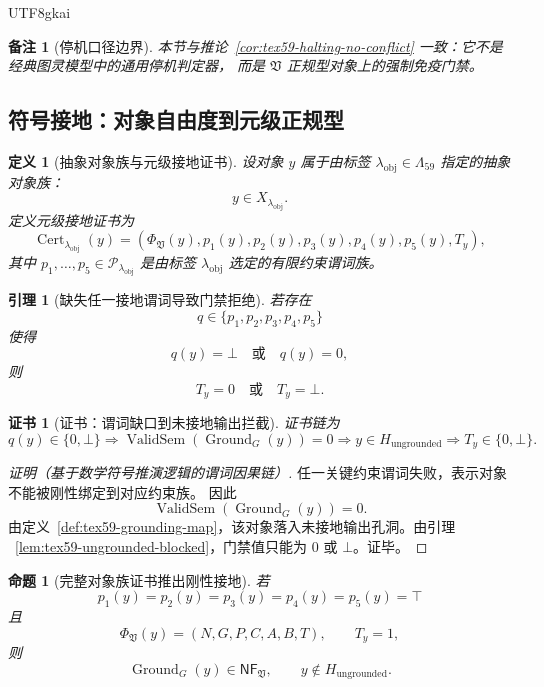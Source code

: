 \documentclass[12pt]{article}
\newtheorem{definition}{定义}[section]
\newtheorem{proposition}{命题}[section]
\newtheorem{lemma}{引理}[section]
\newtheorem{remark}{备注}[section]
\newtheorem{Certificate}{证书}[section]
\newcommand{\Vsys}{\mathfrak V}
\newcommand{\NF}{\mathsf{NF}}
\newcommand{\CertTuple}{(N,G,P,C,A,B,T)}
\DeclareMathOperator{\Cert}{Cert}
\DeclareMathOperator{\ValidSem}{ValidSem}
\DeclareMathOperator{\Ground}{Ground}
\begin{document}
\begin{CJK*}{UTF8}{gkai}
\begin{remark}[停机口径边界]
本节与推论~\ref{cor:tex59-halting-no-conflict} 一致：它不是经典图灵模型中的通用停机判定器，
而是 \(\Vsys\) 正规型对象上的强制免疫门禁。
\end{remark}

\subsection{符号接地：对象自由度到元级正规型}
\label{subsec:tex59-m4-ground}

\begin{definition}[抽象对象族与元级接地证书]
\label{def:tex59-obj-grounding}
设对象 \(y\) 属于由标签 \(\lambda_{\mathrm{obj}}\in\Lambda_{59}\) 指定的抽象对象族：
\[
  y\in X_{\lambda_{\mathrm{obj}}}.
\]
定义元级接地证书为
\[
  \Cert_{\lambda_{\mathrm{obj}}}(y)
  =
  \left(
    \Phi_{\Vsys}(y),
    p_1(y),
    p_2(y),
    p_3(y),
    p_4(y),
    p_5(y),
    T_y
  \right),
\]
其中 \(p_1,\ldots,p_5\in\mathcal P_{\lambda_{\mathrm{obj}}}\) 是由标签
\(\lambda_{\mathrm{obj}}\) 选定的有限约束谓词族。
\end{definition}

\begin{lemma}[缺失任一接地谓词导致门禁拒绝]
\label{lem:tex59-obj-predicate-block}
若存在
\[
  q\in\{p_1,p_2,p_3,p_4,p_5\}
\]
使得
\[
  q(y)=\bot
  \quad\text{或}\quad
  q(y)=0,
\]
则
\[
  T_y=0
  \quad\text{或}\quad
  T_y=\bot.
\]
\end{lemma}

\begin{Certificate}[证书：谓词缺口到未接地输出拦截]
\label{cert:tex59-obj-predicate-block}
证书链为
\[
  q(y)\in\{0,\bot\}
  \Longrightarrow
  \ValidSem(\Ground_G(y))=0
  \Longrightarrow
  y\in H_{\mathrm{ungrounded}}
  \Longrightarrow
  T_y\in\{0,\bot\}.
\]
\end{Certificate}

\begin{proof}[证明（基于数学符号推演逻辑的谓词因果链）]
任一关键约束谓词失败，表示对象不能被刚性绑定到对应约束族。
因此
\[
  \ValidSem(\Ground_G(y))=0.
\]
由定义~\ref{def:tex59-grounding-map}，该对象落入未接地输出孔洞。由引理
~\ref{lem:tex59-ungrounded-blocked}，门禁值只能为 \(0\) 或 \(\bot\)。证毕。
\end{proof}

\begin{proposition}[完整对象族证书推出刚性接地]
\label{prop:tex59-obj-grounded}
若
\[
  p_1(y)=
  p_2(y)=
  p_3(y)=
  p_4(y)=
  p_5(y)=\top
\]
且
\[
  \Phi_{\Vsys}(y)=\CertTuple,
  \qquad
  T_y=1,
\]
则
\[
  \Ground_G(y)\in\NF_{\Vsys},
  \qquad
  y\notin H_{\mathrm{ungrounded}}.
\]
\end{proposition}


\end{CJK*}
\end{document}
